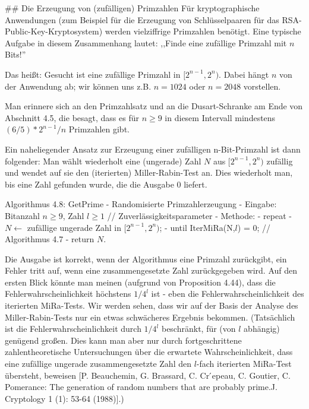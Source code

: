 \documentclass[a4paper]{article}
\begin{document}
\begin{multicols}{3}
{{{                ## Die Erzeugung von (zufälligen) Primzahlen
                Für kryptographische Anwendungen (zum Beispiel für die Erzeugung von Schlüsselpaaren für das RSA-Public-Key-Kryptosystem) werden vielziffrige Primzahlen benötigt. Eine typische Aufgabe in diesem Zusammenhang lautet: ,,Finde eine zufällige Primzahl mit $n$ Bits!''

                Das heißt: Gesucht ist eine zufällige Primzahl in $[2^{n-1}, 2^n)$. Dabei hängt $n$ von der Anwendung ab; wir können uns z.B. $n=1024$ oder $n=2048$ vorstellen.

                Man erinnere sich an den Primzahlsatz und an die Dusart-Schranke am Ende von Abschnitt 4.5, die besagt, dass es für $n\geq 9$ in diesem Intervall mindestens $(6/5)*
            2^{n-1}/n$ Primzahlen gibt.

                Ein naheliegender Ansatz zur Erzeugung einer zufälligen n-Bit-Primzahl ist dann folgender: Man wählt wiederholt eine (ungerade) Zahl $N$ aus $[2^{n-1}, 2^n)$ zufällig und wendet auf sie den (iterierten) Miller-Rabin-Test an. Dies wiederholt man, bis eine Zahl gefunden wurde, die die Ausgabe $0$ liefert.

                Algorithmus 4.8: GetPrime - Randomisierte Primzahlerzeugung
                - Eingabe: Bitanzahl $n\geq 9$, Zahl $l\geq 1$ // Zuverlässigkeitsparameter
                - Methode:
                - repeat
                - $N\leftarrow$ zufällige ungerade Zahl in $[2^{n-1}, 2^n)$;
                - until IterMiRa(N,$l$) = 0; // Algorithmus 4.7
                - return $N$.

                Die Ausgabe ist korrekt, wenn der Algorithmus eine Primzahl zurückgibt, ein Fehler tritt auf, wenn eine zusammengesetzte Zahl zurückgegeben wird. Auf den ersten Blick könnte man meinen (aufgrund von Proposition 4.44), dass die Fehlerwahrscheinlichkeit höchstens $1/4^l$ ist - eben die Fehlerwahrscheinlichkeit des iterierten MiRa-Tests. Wir werden sehen, dass wir auf der Basis der Analyse des Miller-Rabin-Tests nur ein etwas schwächeres Ergebnis bekommen. (Tatsächlich ist die Fehlerwahrscheinlichkeit durch $1/4^l$ beschränkt, für (von $l$ abhängig) genügend großen. Dies kann man aber nur durch fortgeschrittene zahlentheoretische Untersuchungen über die erwartete Wahrscheinlichkeit, dass eine zufällige ungerade zusammengesetzte Zahl den $l$-fach iterierten MiRa-Test übersteht, beweisen [P. Beauchemin, G. Brassard, C. Cr ́epeau, C. Goutier, C. Pomerance: The generation of random numbers that are probably prime.J. Cryptology 1 (1): 53-64 (1988)].)

}}}
\end{multicols}
\end{document}
